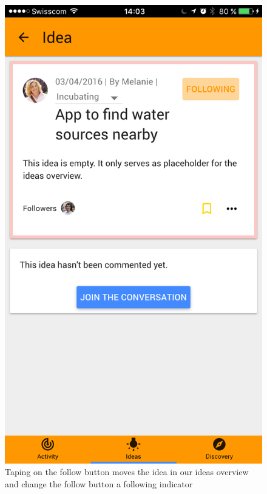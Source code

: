 \documentclass[a4paper,12pt,twoside]{article}
\begin{document}
\begin{figure}[!htb]
    \begin{minipage}[t]{.48\textwidth}
        \centering
        \includegraphics[width=.67\textwidth]{images/flow_follow_3.png}
        \caption{Taping on the follow button moves the idea in our ideas overview and change the follow button a following indicator}
    \end{minipage}
    \hfill
    \begin{minipage}[t]{.48\textwidth}
        \centering

\end{minipage}
\end{figure}
\end{document}
